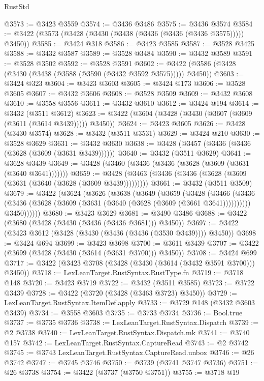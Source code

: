 \begin{lexlean}{RustStd}
\begin{coremodule}
@3573 := @3423 @3559
@3574 := @3436 @3486
@3575 := @3436 @3574
@3584 := @3422 (@3573 (@3428 (@3430 (@3438 (@3436 (@3436 (@3436 @3575))))) @3450))
@3585 := @3424 @318
@3586 := @3423 @3585
@3587 := @3528 @3425
@3588 := @3432 @3587
@3589 := @3528 @3484
@3590 := @3432 @3589
@3591 := @3528 @3502
@3592 := @3528 @3591
@3602 := @3422 (@3586 (@3428 (@3430 (@3438 (@3588 (@3590 (@3432 @3592 @3575))))) @3450))
@3603 := @3424 @323
@3604 := @3423 @3603
@3605 := @3424 @173
@3606 := @3528 @3605
@3607 := @3432 @3606
@3608 := @3528 @3509
@3609 := @3432 @3608
@3610 := @3558 @3556
@3611 := @3432 @3610
@3612 := @3424 @194
@3614 := @3432 (@3511 @3612)
@3623 := @3422 (@3604 (@3428 (@3430 (@3607 (@3609 (@3611 (@3614 @3439))))) @3450))
@3624 := @3423 @3605
@3626 := @3428 (@3430 @3574)
@3628 := @3432 (@3511 @3531)
@3629 := @3424 @210
@3630 := @3528 @3629
@3631 := @3432 @3630
@3638 := @3428 (@3457 (@3436 (@3436 (@3628 (@3609 (@3631 @3439))))))
@3640 := @3432 (@3511 @3629)
@3641 := @3628 @3439
@3649 := @3428 (@3460 (@3436 (@3436 (@3628 (@3609 (@3631 (@3640 @3641)))))))
@3659 := @3428 (@3463 (@3436 (@3436 (@3628 (@3609 (@3631 (@3640 (@3628 (@3609 @3439)))))))))
@3661 := @3432 (@3511 @3509)
@3679 := @3422
    (@3624
      (@3626
        (@3638
          (@3649
            (@3659
              (@3428
                (@3466
                  (@3436 (@3436 (@3628 (@3609 (@3631 (@3640 (@3628 (@3609 (@3661 @3641))))))))))
                @3450))))))
@3680 := @3423 @3629
@3681 := @3490 @3486
@3688 := @3422 (@3680 (@3428 (@3430 (@3436 (@3436 @3681))) @3450))
@3697 := @3422 (@3423 @3612 (@3428 (@3430 (@3436 (@3436 (@3530 @3439)))) @3450))
@3698 := @3424 @694
@3699 := @3423 @3698
@3700 := @3611 @3439
@3707 := @3422 (@3699 (@3428 (@3430 (@3614 (@3631 @3700))) @3450))
@3708 := @3424 @699
@3717 := @3422 (@3423 @3708 (@3428 (@3430 (@3614 (@3432 @3591 @3700))) @3450))
@3718 := LexLeanTarget.RustSyntax.RustType.fn
@3719 := @3718 @148
@3720 := @3423 @3719
@3722 := @3432 (@3511 @3585)
@3723 := @3722 @3439
@3728 := @3422 (@3720 (@3428 (@3463 @3723) @3450))
@3729 := LexLeanTarget.RustSyntax.ItemDef.apply
@3733 := @3729 @148 (@3432 @3603 @3439)
@3734 := @3558 @3603
@3735 := @3733 @3734
@3736 := Bool.true
@3737 := @3735 @3736
@3738 := LexLeanTarget.RustSyntax.Dispatch
@3739 := @2 @3738
@3740 := LexLeanTarget.RustSyntax.Dispatch.mk
@3741 := @3740 @157
@3742 := LexLeanTarget.RustSyntax.CaptureRead
@3743 := @2 @3742
@3745 := @3743 LexLeanTarget.RustSyntax.CaptureRead.unbox
@3746 := @26 @3742
@3747 := @3745 @3746
@3750 := @3739 (@3741 @3747 @3736)
@3751 := @26 @3738
@3754 := @3422 (@3737 (@3750 @3751))
@3755 := @3718 @19

\end{coremodule}
\end{lexlean}
